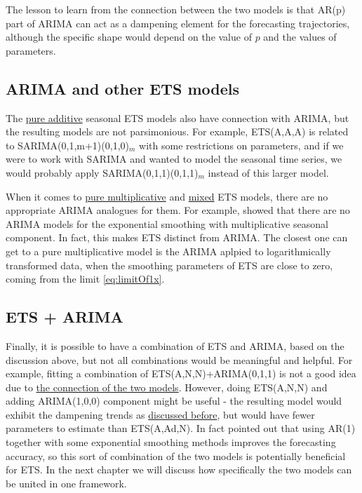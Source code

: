 \documentclass[
]{book}
\theoremstyle{definition}
\theoremstyle{definition}
\theoremstyle{definition}
\theoremstyle{definition}
\theoremstyle{remark}
\begin{document}
The lesson to learn from the connection between the two models is that AR(p) part of ARIMA can act as a dampening element for the forecasting trajectories, although the specific shape would depend on the value of \(p\) and the values of parameters.

\hypertarget{arima-and-other-ets-models}{%
\subsection{ARIMA and other ETS models}\label{arima-and-other-ets-models}}

The \protect\hyperlink{ADAMETSPureAdditive}{pure additive} seasonal ETS models also have connection with ARIMA, but the resulting models are not parsimonious. For example, ETS(A,A,A) is related to SARIMA(0,1,m+1)(0,1,0)\(_m\) \citep{Mckenzie1976, Chatfield1977} with some restrictions on parameters, and if we were to work with SARIMA and wanted to model the seasonal time series, we would probably apply SARIMA(0,1,1)(0,1,1)\(_m\) instead of this larger model.

When it comes to \protect\hyperlink{ADAMETSPureMultiplicative}{pure multiplicative} and \protect\hyperlink{ADAMETSMixedModels}{mixed} ETS models, there are no appropriate ARIMA analogues for them. For example, \citet{Chatfield1977} showed that there are no ARIMA models for the exponential smoothing with multiplicative seasonal component. In fact, this makes ETS distinct from ARIMA. The closest one can get to a pure multiplicative model is the ARIMA aplpied to logarithmically transformed data, when the smoothing parameters of ETS are close to zero, coming from the limit \eqref{eq:limitOf1x}.

\hypertarget{ets-arima}{%
\subsection{ETS + ARIMA}\label{ets-arima}}

Finally, it is possible to have a combination of ETS and ARIMA, based on the discussion above, but not all combinations would be meaningful and helpful. For example, fitting a combination of ETS(A,N,N)+ARIMA(0,1,1) is not a good idea due to \protect\hyperlink{ARIMAETS011}{the connection of the two models}. However, doing ETS(A,N,N) and adding ARIMA(1,0,0) component might be useful - the resulting model would exhibit the dampening trends as \protect\hyperlink{ARIMAETS112}{discussed before}, but would have fewer parameters to estimate than ETS(A,Ad,N). In fact \citet{Gardner1985} pointed out that using AR(1) together with some exponential smoothing methods improves the forecasting accuracy, so this sort of combination of the two models is potentially beneficial for ETS. In the next chapter we will discuss how specifically the two models can be united in one framework.
\end{document}

